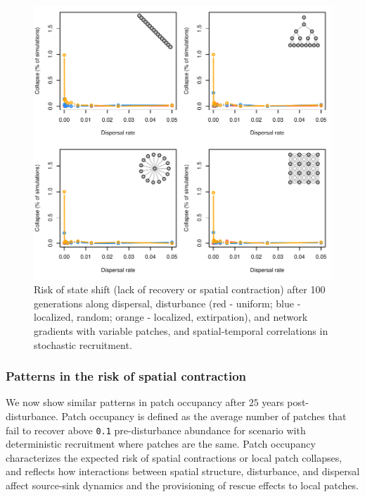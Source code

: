 \documentclass[
]{article}
\begin{document}
\begin{figure}[H]

{\centering \includegraphics{Managing_for_ecological_surprises_in_metapopulations_files/figure-latex/state shifts with variable patches and space-time stochasticity-1} 

}

\caption{Risk of state shift (lack of recovery or spatial contraction) after 100 generations along dispersal, disturbance (red - uniform; blue - localized, random; orange - localized, extirpation), and network gradients with variable patches, and spatial-temporal correlations in stochastic recruitment.}\label{fig:state shifts with variable patches and space-time stochasticity}
\end{figure}

\newpage

\hypertarget{patterns-in-the-risk-of-spatial-contraction}{%
\subsubsection{Patterns in the risk of spatial
contraction}\label{patterns-in-the-risk-of-spatial-contraction}}

We now show similar patterns in patch occupancy after \(25\) years
post-disturbance. Patch occupancy is defined as the average number of
patches that fail to recover above \texttt{0.1} pre-disturbance
abundance for scenario with deterministic recruitment where patches are
the same. Patch occupancy characterizes the expected risk of spatial
contractions or local patch collapses, and reflects how interactions
between spatial structure, disturbance, and dispersal affect source-sink
dynamics and the provisioning of rescue effects to local patches.
\end{document}

